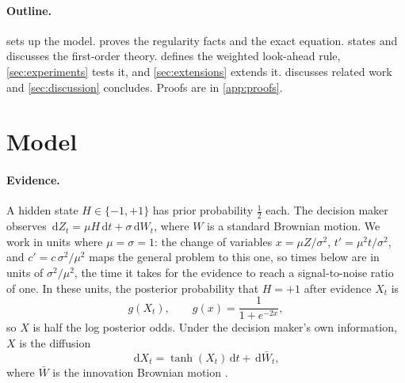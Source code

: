 \documentclass[11pt]{article}
\theoremstyle{definition}
\theoremstyle{remark}
\newcommand{\dd}{\,\mathrm{d}}
\begin{document}
\paragraph{Outline.}
 sets up the model.  proves the regularity facts and the exact
equation.  states and discusses the first-order theory. 
defines the weighted look-ahead rule, \cref{sec:experiments} tests it, and
\cref{sec:extensions} extends it.  discusses related work and
\cref{sec:discussion} concludes. Proofs are in \cref{app:proofs}.

\section{Model}
\label{sec:model}

\paragraph{Evidence.}
A hidden state $H \in \{-1, +1\}$ has prior probability $\tfrac12$ each. The decision maker
observes $\dd Z_t = \mu H \dd t + \sigma \dd W_t$, where $W$ is a standard Brownian motion. We work
in units where $\mu = \sigma = 1$: the change of variables $x = \mu Z/\sigma^2$,
$t' = \mu^2 t/\sigma^2$, and $c' = c\,\sigma^2/\mu^2$ maps the general problem to this one, so
times below are in units of $\sigma^2/\mu^2$, the time it takes for the evidence to reach a
signal-to-noise ratio of one. In these units, the posterior probability that $H = +1$ after
evidence $X_t$ is
\begin{equation}
  g(X_t), \qquad g(x) = \frac{1}{1 + e^{-2x}},
\end{equation}
so $X$ is half the log posterior odds. Under the decision maker's own information, $X$ is the
diffusion
\begin{equation}
  \dd X_t = \tanh(X_t)\dd t + \dd \bar W_t,
  \label{eq:filtered}
\end{equation}
where $\bar W$ is the innovation Brownian motion \citep[Ch.~VI]{peskir2006}.
\end{document}
